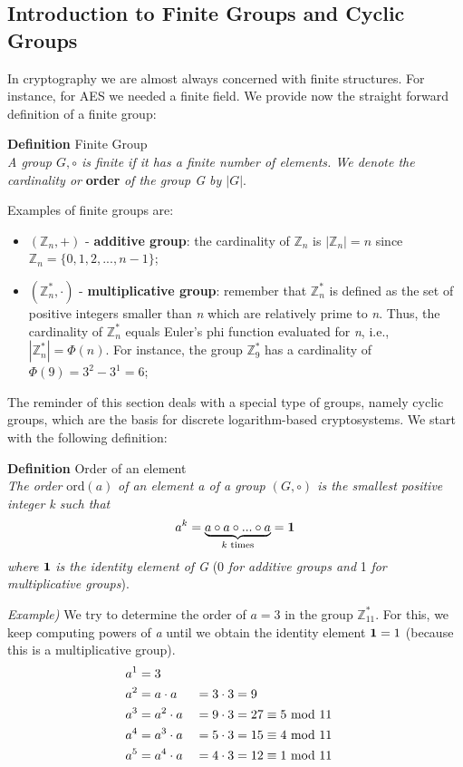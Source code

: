 \subsection{Introduction to Finite Groups and Cyclic Groups}
In cryptography we are almost always concerned with finite structures. For instance, for AES we needed a finite field. We provide now the straight forward definition of a finite group:
\begin{framed}
    \hfill\break \textbf{Definition} Finite Group\\
    \textit{A group $G,\circ$ is finite if it has a finite number of elements. We denote the cardinality or} \textbf{order} \textit{of the group G by $|G|$}.
\end{framed}
\hfill\break
Examples of finite groups are:
\begin{itemize}
    \item $(\mathbb{Z}_n,+)$ - \textbf{additive group}: the cardinality of $\mathbb{Z}_n$ is $|\mathbb{Z}_n|=n$ since $\mathbb{Z}_n=\{0,1,2,...,n-1\}$;
    \item $(\mathbb{Z}_n^*,\cdot)$ - \textbf{multiplicative group}: remember that $\mathbb{Z}_n^*$ is defined as the set of positive integers smaller than \textit{n} which are relatively prime to \textit{n}. Thus, the cardinality of $\mathbb{Z}_n^*$ equals Euler's phi function evaluated for \textit{n}, i.e., $|\mathbb{Z}_n^*|=\Phi(n)$. For instance, the group $\mathbb{Z}_9^*$ has a cardinality of $\Phi(9)=3^2-3^1=6$;
\end{itemize}
The reminder of this section deals with a special type of groups, namely cyclic groups, which are the basis for discrete logarithm-based cryptosystems. We start with the following definition:
\begin{framed}
    \hfill\break\textbf{Definition} Order of an element\\
    \textit{The order} $\text{ord}(a)$ \textit{of an element a of a group $(G,\circ)$ is the smallest positive integer k such that}
    $$a^k=\underbrace{a\circ a\circ...\circ a}_{k\text{ times}}=\textbf{1}$$
    \textit{where} $\textbf{1}$ \textit{is the identity element of G} (0 \textit{for additive groups and} 1 \textit{for multiplicative groups}).
\end{framed}
\hfill\break\textit{Example)} We try to determine the order of $a=3$ in the group $\mathbb{Z}_{11}^*$. For this, we keep computing powers of \textit{a} until we obtain the identity element $\textbf{1}=1$ (because this is a multiplicative group).
\begin{alignat*}{2}
    &a^1=3\\
    &a^2=a\cdot a &&= 3\cdot3=9\\
    &a^3=a^2\cdot a &&= 9\cdot3=27 \equiv 5\text{ mod } 11\\
    &a^4=a^3\cdot a &&= 5\cdot3=15 \equiv 4\text{ mod } 11\\
    &a^5=a^4\cdot a &&= 4\cdot3=12 \equiv 1\text{ mod } 11
\end{alignat*}
